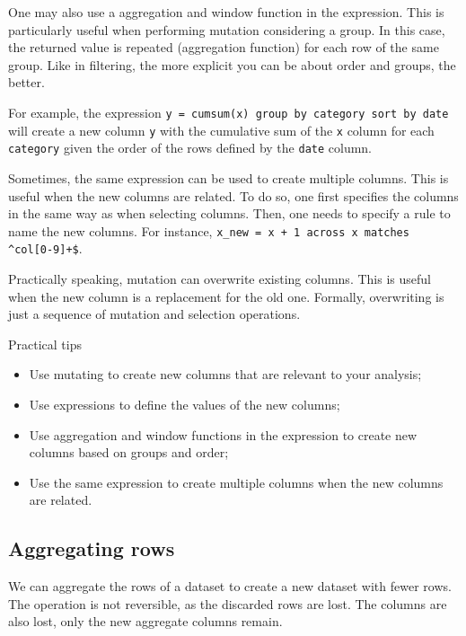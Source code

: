One may also use a aggregation and window function in the expression. This is particularly
useful when performing mutation considering a group.  In this case, the returned value is
repeated (aggregation function) for each row of the same group.  Like in filtering, the
more explicit you can be about order and groups, the better.

For example, the expression \texttt{y = cumsum(x) group by category sort by date} will
create a new column \texttt{y} with the cumulative sum of the \texttt{x} column for each
\texttt{category} given the order of the rows defined by the \texttt{date} column.

Sometimes, the same expression can be used to create multiple columns.  This is useful
when the new columns are related.  To do so, one first specifies the columns in the same way as
when selecting columns.  Then, one needs to specify a rule to name the new columns.
For instance, \texttt{x\_new = x + 1 across x matches \textasciicircum{}col[0-9]+\$}.

Practically speaking, mutation can overwrite existing columns.  This is useful when the
new column is a replacement for the old one.  Formally, overwriting is just a sequence of
mutation and selection operations.

\begin{mainbox}{Practical tips}
  \begin{itemize}
    \item Use mutating to create new columns that are relevant to your analysis;
    \item Use expressions to define the values of the new columns;
    \item Use aggregation and window functions in the expression to create new columns based on
      groups and order;
    \item Use the same expression to create multiple columns when the new columns are related.
  \end{itemize}
\end{mainbox}

\subsection{Aggregating rows}

We can aggregate the rows of a dataset to create a new dataset with fewer rows.    The
operation is not reversible, as the discarded rows are lost.  The columns are also lost,
only the new aggregate columns remain.

